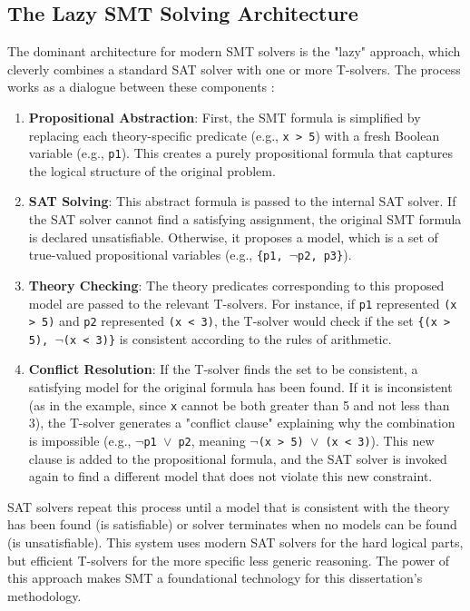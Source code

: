 \documentclass[12pt, a4paper, oneside]{report} %
\begin{document}
\subsection{The Lazy SMT Solving Architecture}

The dominant architecture for modern SMT solvers is the "lazy" approach, which cleverly combines a standard SAT solver with one or more T-solvers. The process works as a dialogue between these components \cite{demoura2011smt}:
\begin{enumerate}
    \item \textbf{Propositional Abstraction}: First, the SMT formula is simplified by replacing each theory-specific predicate (e.g., \texttt{x > 5}) with a fresh Boolean variable (e.g., \texttt{p1}). This creates a purely propositional formula that captures the logical structure of the original problem.
    \item \textbf{SAT Solving}: This abstract formula is passed to the internal SAT solver. If the SAT solver cannot find a satisfying assignment, the original SMT formula is declared unsatisfiable. Otherwise, it proposes a model, which is a set of true-valued propositional variables (e.g., \texttt{\{p1, \(\neg\)p2, p3\}}).
    \item \textbf{Theory Checking}: The theory predicates corresponding to this proposed model are passed to the relevant T-solvers. For instance, if \texttt{p1} represented \texttt{(x > 5)} and \texttt{p2} represented \texttt{(x < 3)}, the T-solver would check if the set \texttt{\{(x > 5), \(\neg\)(x < 3)\}} is consistent according to the rules of arithmetic.
    \item \textbf{Conflict Resolution}: If the T-solver finds the set to be consistent, a satisfying model for the original formula has been found. If it is inconsistent (as in the example, since \texttt{x} cannot be both greater than 5 and not less than 3), the T-solver generates a "conflict clause" explaining why the combination is impossible (e.g., \texttt{\(\neg\)p1 \(\lor\) p2}, meaning \texttt{\(\neg\)(x > 5) \(\lor\) (x < 3)}). This new clause is added to the propositional formula, and the SAT solver is invoked again to find a different model that does not violate this new constraint.
\end{enumerate}
SAT solvers repeat this process until a model that is consistent with the theory has been found (is satisfiable) or solver terminates when no models can be found (is unsatisfiable). This system uses modern SAT solvers for the hard logical parts, but efficient T-solvers for the more specific less generic reasoning. The power of this approach makes SMT a foundational technology for this dissertation's methodology.
\end{document}
